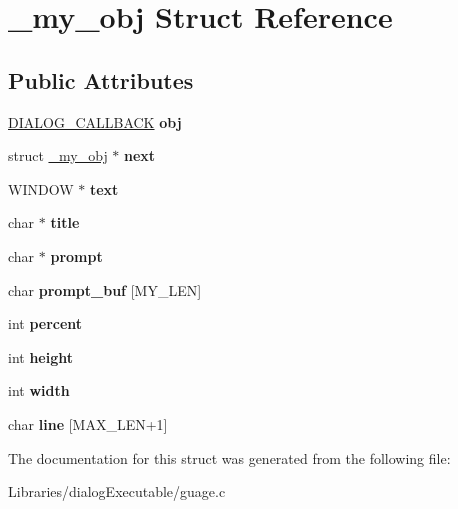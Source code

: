 \hypertarget{struct__my__obj}{}\section{\+\_\+my\+\_\+obj Struct Reference}
\label{struct__my__obj}
\subsection*{Public Attributes}
\begin{DoxyCompactItemize}
\item 
\hyperlink{struct__dlg__callback}{D\+I\+A\+L\+O\+G\+\_\+\+C\+A\+L\+L\+B\+A\+CK} {\bfseries obj}\hypertarget{struct__my__obj_a23ded1d67c39bebdedb6bc4603c28683}{}\label{struct__my__obj_a23ded1d67c39bebdedb6bc4603c28683}

\item 
struct \hyperlink{struct__my__obj}{\+\_\+my\+\_\+obj} $\ast$ {\bfseries next}\hypertarget{struct__my__obj_a00b9960183d39719a6f7aac89bb63b50}{}\label{struct__my__obj_a00b9960183d39719a6f7aac89bb63b50}

\item 
W\+I\+N\+D\+OW $\ast$ {\bfseries text}\hypertarget{struct__my__obj_acb98cf44d719637b8027448f8082a102}{}\label{struct__my__obj_acb98cf44d719637b8027448f8082a102}

\item 
char $\ast$ {\bfseries title}\hypertarget{struct__my__obj_ae9bea09d5bd2a1d6f46c00901a5905d5}{}\label{struct__my__obj_ae9bea09d5bd2a1d6f46c00901a5905d5}

\item 
char $\ast$ {\bfseries prompt}\hypertarget{struct__my__obj_a200023210ac6c0744867ca674d076fd4}{}\label{struct__my__obj_a200023210ac6c0744867ca674d076fd4}

\item 
char {\bfseries prompt\+\_\+buf} \mbox{[}M\+Y\+\_\+\+L\+EN\mbox{]}\hypertarget{struct__my__obj_afd354cfbb60d0e2109a856538f93a473}{}\label{struct__my__obj_afd354cfbb60d0e2109a856538f93a473}

\item 
int {\bfseries percent}\hypertarget{struct__my__obj_a0aae094f0a27f64b4d0cb8c0c1c6ce6d}{}\label{struct__my__obj_a0aae094f0a27f64b4d0cb8c0c1c6ce6d}

\item 
int {\bfseries height}\hypertarget{struct__my__obj_a98ee5ed0ed812863f16f094fa8d83bb6}{}\label{struct__my__obj_a98ee5ed0ed812863f16f094fa8d83bb6}

\item 
int {\bfseries width}\hypertarget{struct__my__obj_a79d995fe4dae50cc6853860c5efe26e0}{}\label{struct__my__obj_a79d995fe4dae50cc6853860c5efe26e0}

\item 
char {\bfseries line} \mbox{[}M\+A\+X\+\_\+\+L\+EN+1\mbox{]}\hypertarget{struct__my__obj_a322c7bc0d2b5b48871917dc91f37b4c5}{}\label{struct__my__obj_a322c7bc0d2b5b48871917dc91f37b4c5}

\end{DoxyCompactItemize}


The documentation for this struct was generated from the following file\+:\begin{DoxyCompactItemize}
\item 
Libraries/dialog\+Executable/guage.\+c\end{DoxyCompactItemize}
